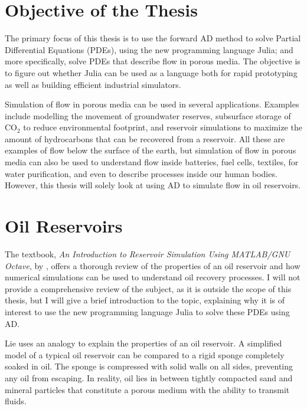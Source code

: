 \section{Objective of the Thesis}
The primary focus of this thesis is to use the forward AD method to solve Partial Differential Equations (PDEs), using the new programming language Julia; and more specifically, solve PDEs that describe flow in porous media. The objective is to figure out whether Julia can be used as a language both for rapid prototyping as well as building efficient industrial simulators. 

Simulation of flow in porous media can be used in several applications. Examples include modelling the movement of groundwater reserves, subsurface storage of CO$_2$ to reduce environmental footprint, and reservoir simulations to maximize the amount of hydrocarbons that can be recovered from a reservoir. All these are examples of flow below the surface of the earth, but simulation of flow in porous media can also be used to understand flow inside batteries, fuel cells, textiles, for water purification, and even to describe processes inside our human bodies. However, this thesis will solely look at using AD to simulate flow in oil reservoirs.

\section{Oil Reservoirs}
\label{sec:OilReservoirs}
The textbook, \textit{An Introduction to Reservoir Simulation Using MATLAB/GNU Octave}, by \emph{\citet{lieMrstUrl}}, offers a thorough review of the properties of an oil reservoir and how numerical simulations can be used to understand oil recovery processes. I will not provide a comprehensive review of the subject, as it is outside the scope of this thesis, but I will give a brief introduction to the topic, explaining why it is of interest to use the new programming language Julia to solve these PDEs using AD.

Lie uses an analogy to explain the properties of an oil reservoir. A simplified model of a typical oil reservoir can be compared to a rigid sponge completely soaked in oil. The sponge is compressed with solid walls on all sides, preventing any oil from escaping. In reality, oil lies in between tightly compacted sand and mineral particles that constitute a porous medium with the ability to transmit fluids. 

